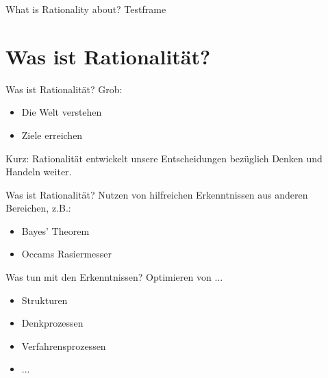 \ifEnglish


\begin{frame}[c]{What is Rationality about?}
    Testframe
\end{frame}



\else

\section{Was ist Rationalität?}

\begin{frame}[c]{Was ist Rationalität?}
    \Large
    Grob:
    \newline
    \begin{itemize}
    \pause
    \item Die Welt verstehen    
    \newline
    \pause
    \pause
    \item Ziele erreichen       
    \newline
    \end{itemize}
    \pause
    \pause
    Kurz: Rationalität entwickelt unsere Entscheidungen bezüglich Denken und Handeln weiter.
\end{frame}


\begin{frame}[c]{Was ist Rationalität?}
    \Large
    Nutzen von hilfreichen Erkenntnissen aus anderen Bereichen, z.B.:
    \begin{itemize}
    \pause
    \item Bayes' Theorem        
    \pause
    \pause
    \pause
    \pause
    \item Occams Rasiermesser   
    \pause
    \pause
    \pause
    \pause
    \end{itemize}
\end{frame}


\begin{frame}[c]{Was tun mit den Erkenntnissen?}
    \Large
    \pause
    Optimieren von ...
    \begin{itemize}
    \pause
    \item Strukturen
    \pause
    \item Denkprozessen
    \pause
    \item Verfahrensprozessen
    \pause
    \item ...
    \end{itemize}
\end{frame}





\fi
